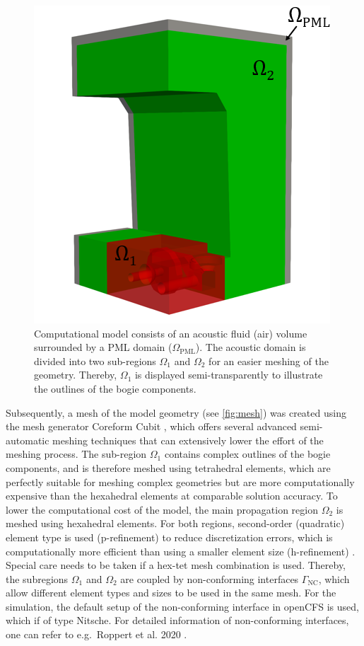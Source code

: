 \begin{figure}
	\centering
	\includegraphics{fig/chap4/mesh/region_small.png}
	\caption{Computational model consists of an acoustic fluid (air) volume surrounded by a PML domain ($\Omega_{\text{PML}}$). The acoustic domain is divided into two sub-regions $\Omega_1$ and $\Omega_2$ for an easier meshing of the geometry. Thereby, $\Omega_1$ is displayed semi-transparently to illustrate the outlines of the bogie components.}
	\label{fig:regions}
\end{figure}
Subsequently, a mesh of the model geometry (see \cref{fig:mesh}) was created using the mesh generator Coreform Cubit \cite{cubit}, which offers several advanced semi-automatic meshing techniques that can extensively lower the effort of the meshing process. The sub-region $\Omega_1$ contains complex outlines of the bogie components, and is therefore meshed using tetrahedral elements, which are perfectly suitable for meshing complex geometries but are more computationally expensive than the hexahedral elements at comparable solution accuracy. To lower the computational cost of the model, the main propagation region $\Omega_2$ is meshed using hexahedral elements. For both regions, second-order (quadratic) element type is used (p-refinement) to reduce discretization errors, which is computationally more efficient than using a smaller element size (h-refinement) \cite{Kuo_2007_prefinement}.
Special care needs to be taken if a hex-tet mesh combination is used. Thereby, the subregions $\Omega_1$ and $\Omega_2$ are coupled by non-conforming interfaces $\Gamma_\text{NC}$, which allow different element types and sizes to be used in the same mesh. For the simulation, the default setup of the non-conforming interface in openCFS is used, which if of type Nitsche. For detailed information of non-conforming interfaces, one can refer to e.g.\ Roppert et al. 2020 \cite{Roppert_2020_nc_interface}.
